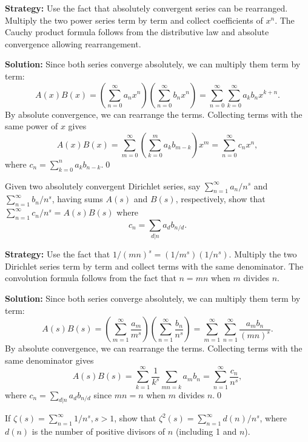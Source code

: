 \noindent\textbf{Strategy:} Use the fact that absolutely convergent series can be rearranged. Multiply the two power series term by term and collect coefficients of \(x^n\). The Cauchy product formula follows from the distributive law and absolute convergence allowing rearrangement.

\bigskip\noindent\textbf{Solution:}
Since both series converge absolutely, we can multiply them term by term:
\[A(x) B(x) = \left(\sum_{n=0}^{\infty} a_n x^n\right) \left(\sum_{n=0}^{\infty} b_n x^n\right) = \sum_{n=0}^{\infty} \sum_{k=0}^{\infty} a_k b_n x^{k+n}.\]
By absolute convergence, we can rearrange the terms. Collecting terms with the same power of \(x\) gives
\[A(x) B(x) = \sum_{m=0}^{\infty} \left(\sum_{k=0}^{m} a_k b_{m-k}\right) x^m = \sum_{n=0}^{\infty} c_n x^n,\]
where \(c_n = \sum_{k=0}^{n} a_k b_{n-k}\).\qed



\begin{problembox}
\begin{problemstatement}
Given two absolutely convergent Dirichlet series, say \(\sum_{n=1}^{\infty} a_n / n^s\) and \(\sum_{n=1}^{\infty} b_n / n^s\), having sums \(A(s)\) and \(B(s)\), respectively, show that \(\sum_{n=1}^{\infty} c_n / n^s = A(s) B(s)\) where
\[c_n = \sum_{d|n} a_d b_{n/d}.\]
\end{problemstatement}
\end{problembox}

\noindent\textbf{Strategy:} Use the fact that \(1/(mn)^s = (1/m^s)(1/n^s)\). Multiply the two Dirichlet series term by term and collect terms with the same denominator. The convolution formula follows from the fact that \(n = mn\) when \(m\) divides \(n\).

\bigskip\noindent\textbf{Solution:}
Since both series converge absolutely, we can multiply them term by term:
\[A(s) B(s) = \left(\sum_{m=1}^{\infty} \frac{a_m}{m^s}\right) \left(\sum_{n=1}^{\infty} \frac{b_n}{n^s}\right) = \sum_{m=1}^{\infty} \sum_{n=1}^{\infty} \frac{a_m b_n}{(mn)^s}.\]
By absolute convergence, we can rearrange the terms. Collecting terms with the same denominator gives
\[A(s) B(s) = \sum_{k=1}^{\infty} \frac{1}{k^s} \sum_{mn=k} a_m b_n = \sum_{n=1}^{\infty} \frac{c_n}{n^s},\]
where \(c_n = \sum_{d|n} a_d b_{n/d}\) since \(mn = n\) when \(m\) divides \(n\).\qed



\begin{problembox}
\begin{problemstatement}
If \(\zeta(s) = \sum_{n=1}^{\infty} 1/n^s, s > 1\), show that \(\zeta^2(s) = \sum_{n=1}^{\infty} d(n) / n^s\), where \(d(n)\) is the number of positive divisors of \(n\) (including 1 and \(n\)).
\end{problemstatement}
\end{problembox}

